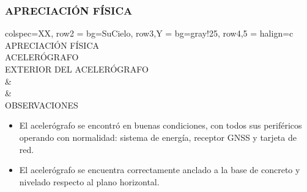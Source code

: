 \subsubsection{APRECIACIÓN FÍSICA}
\begin{tblr}{
        colspec={XX},
        row{2} = {bg=SuCielo},
        row{3,Y} = {bg=gray!25},
        row{4,5} = {halign=c}
    }
     APRECIACIÓN FÍSICA \\
     ACELERÓGRAFO \MakeUppercase{} \\
     EXTERIOR DEL ACELERÓGRAFO \\
     &
     \\
     &
     \\
     OBSERVACIONES \\
     \begin{itemize}
        \item El acelerógrafo se encontró en buenas condiciones, con todos sus periféricos operando con normalidad: sistema de energía, receptor GNSS y tarjeta de red.
        \item El acelerógrafo se encuentra correctamente anclado a la base de concreto y nivelado respecto al plano horizontal.
    \end{itemize}
\end{tblr}
\newpage
